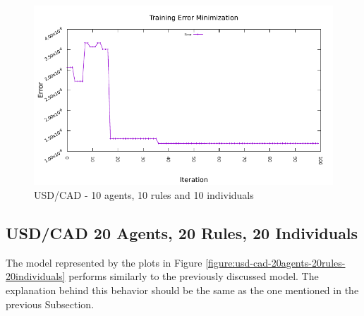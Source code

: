 \begin{figure}[htp]
  \medskip

  \includegraphics[width=.45\textwidth]{img/plots/usd_cad_h1-10agents-10rules-10ind-100gen_error_minimization.pdf}

  \caption{USD/CAD - 10 agents, 10 rules and 10 individuals}
  \label{figure:usd-cad-10agents-10rules-10individuals}
\end{figure}

\newpage

\subsection{USD/CAD 20 Agents, 20 Rules, 20 Individuals}
\label{results:forecast-usd-cad-20agents-20rules-20individuals}

The model represented by the plots in Figure \ref{figure:usd-cad-20agents-20rules-20individuals} performs similarly to the previously discussed model. The explanation behind this behavior should be the same as the one mentioned in the previous Subsection.

